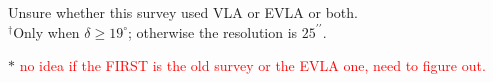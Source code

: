\documentclass[a4paper,11pt]{report}
\newcommand{\red}[1]{\textcolor{red}{#1}}
\newcommand{\arcs}{^{\prime \prime}}
\begin{document}
\begin{table}[hb!]
{\begin{minipage}{0.98\textheight}
\begin{center}
\begin{tabular}
            \bottomrule
        \end{tabular}
        \end{center}

        \vspace{4pt}
        \footnotesize *Unsure whether this survey used VLA or EVLA or both. \\
        \footnotesize $^{\dagger}$Only when $\delta \ge 19^\circ$; otherwise the resolution is $25\arcs$.
        \end{minipage}%
    }
\end{table}


$*$ \red{no idea if the FIRST is the old survey or the EVLA one, need to figure out.}
\end{document}
